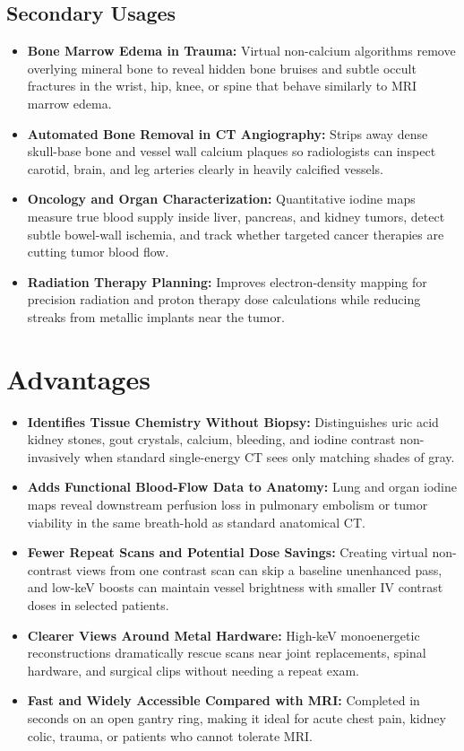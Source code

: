 \subsection{Secondary Usages}
\begin{itemize}
\item \textbf{Bone Marrow Edema in Trauma:} Virtual non-calcium algorithms remove overlying mineral bone to reveal hidden bone bruises and subtle occult fractures in the wrist, hip, knee, or spine that behave similarly to MRI marrow edema.
\item \textbf{Automated Bone Removal in CT Angiography:} Strips away dense skull-base bone and vessel wall calcium plaques so radiologists can inspect carotid, brain, and leg arteries clearly in heavily calcified vessels.
\item \textbf{Oncology and Organ Characterization:} Quantitative iodine maps measure true blood supply inside liver, pancreas, and kidney tumors, detect subtle bowel-wall ischemia, and track whether targeted cancer therapies are cutting tumor blood flow.
\item \textbf{Radiation Therapy Planning:} Improves electron-density mapping for precision radiation and proton therapy dose calculations while reducing streaks from metallic implants near the tumor.
\end{itemize}

\section{Advantages}
\begin{itemize}
\item \textbf{Identifies Tissue Chemistry Without Biopsy:} Distinguishes uric acid kidney stones, gout crystals, calcium, bleeding, and iodine contrast non-invasively when standard single-energy CT sees only matching shades of gray.
\item \textbf{Adds Functional Blood-Flow Data to Anatomy:} Lung and organ iodine maps reveal downstream perfusion loss in pulmonary embolism or tumor viability in the same breath-hold as standard anatomical CT.
\item \textbf{Fewer Repeat Scans and Potential Dose Savings:} Creating virtual non-contrast views from one contrast scan can skip a baseline unenhanced pass, and low-keV boosts can maintain vessel brightness with smaller IV contrast doses in selected patients.
\item \textbf{Clearer Views Around Metal Hardware:} High-keV monoenergetic reconstructions dramatically rescue scans near joint replacements, spinal hardware, and surgical clips without needing a repeat exam.
\item \textbf{Fast and Widely Accessible Compared with MRI:} Completed in seconds on an open gantry ring, making it ideal for acute chest pain, kidney colic, trauma, or patients who cannot tolerate MRI.
\end{itemize}

